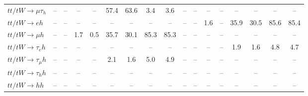\begin{sidewaystable}[ht]
{\begin{tabular}{|l|cc|cc|cc|cc|cc|cc|cc|cc|}
    $tt/tW \to \mu\tau_{h}$            &   -- &   -- &   -- &   -- & 57.4 & 63.6 &  3.4 &  3.6 &   -- &   -- &   -- &   -- &   -- &   -- &   -- &   -- \\ 
    $tt/tW \to eh$                     &   -- &   -- &   -- &   -- &   -- &   -- &   -- &   -- &   -- &   -- &  1.6 &   -- & 35.9 & 30.5 & 85.6 & 85.4 \\ 
    $tt/tW \to \mu h$                  &   -- &   -- &  1.7 &  0.5 & 35.7 & 30.1 & 85.3 & 85.3 &   -- &   -- &   -- &   -- &   -- &   -- &   -- &   -- \\ 
    $tt/tW \to \tau_{e}h$              &   -- &   -- &   -- &   -- &   -- &   -- &   -- &   -- &   -- &   -- &   -- &   -- &  1.9 &  1.6 &  4.8 &  4.7 \\ 
    $tt/tW \to \tau_{\mu}h$            &   -- &   -- &   -- &   -- &  2.1 &  1.6 &  5.0 &  4.9 &   -- &   -- &   -- &   -- &   -- &   -- &   -- &   -- \\ 
    $tt/tW \to \tau_{h}h$              &   -- &   -- &   -- &   -- &   -- &   -- &   -- &   -- &   -- &   -- &   -- &   -- &   -- &   -- &   -- &   -- \\ 
    $tt/tW \to hh$                     &   -- &   -- &   -- &   -- &   -- &   -- &   -- &   -- &   -- &   -- &   -- &   -- &   -- &   -- &   -- &   -- \\ 

    \hline
    \end{tabular}}
    \label{tab:analysis:selection:signal_breakdown}
    
\end{sidewaystable}
